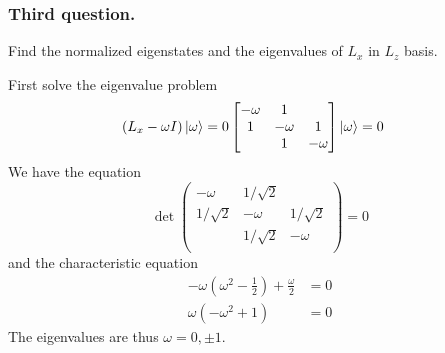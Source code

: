 \documentclass[../../../main.tex]{subfiles}
\begin{document}
\subsubsection{Third question.}
Find the normalized eigenstates and the eigenvalues of $L_x$ in $L_z$ basis.

First solve the eigenvalue problem
\begin{align*}
    \left( L_x-\omega I  \right) \ket{\omega} & = 0
    \begin{bmatrix}
        -\omega & 1       &         \\
        1       & -\omega & 1       \\
                & 1       & -\omega \\
    \end{bmatrix}
    \ket{\omega}=0
\end{align*}
We have the equation
\begin{equation*}
    \det
    \begin{pmatrix}
        -\omega    & 1/\sqrt{2 } &            \\
        1/\sqrt{2} & -\omega     & 1/\sqrt{2} \\
                   & 1/\sqrt{2}  & -\omega    \\
    \end{pmatrix}
    =0
\end{equation*}
and the characteristic equation
\begin{align*}
    -\omega \left( \omega^2- \frac{1 }{2} \right) +\frac{\omega }{2} & = 0 \\
    \omega \left( -\omega^2+1  \right)                               & = 0
\end{align*}
The eigenvalues are thus $\omega=0,\pm 1$.
\end{document}
